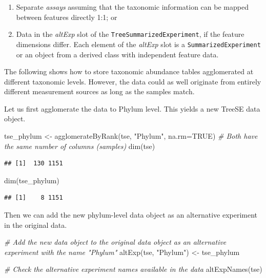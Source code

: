 \documentclass[
]{book}
\newenvironment{Shaded}{\begin{snugshade}}{\end{snugshade}}
\newcommand{\AttributeTok}[1]{\textcolor[rgb]{0.77,0.63,0.00}{#1}}
\newcommand{\CommentTok}[1]{\textcolor[rgb]{0.56,0.35,0.01}{\textit{#1}}}
\newcommand{\ConstantTok}[1]{\textcolor[rgb]{0.00,0.00,0.00}{#1}}
\newcommand{\FunctionTok}[1]{\textcolor[rgb]{0.00,0.00,0.00}{#1}}
\newcommand{\NormalTok}[1]{#1}
\newcommand{\OtherTok}[1]{\textcolor[rgb]{0.56,0.35,0.01}{#1}}
\newcommand{\StringTok}[1]{\textcolor[rgb]{0.31,0.60,0.02}{#1}}
\providecommand{\tightlist}{%
  \setlength{\itemsep}{0pt}\setlength{\parskip}{0pt}}
\begin{document}
\begin{enumerate}
\def\labelenumi{\arabic{enumi}.}
\tightlist
\item
  Separate \emph{assays} assuming that the taxonomic information can be mapped
  between features directly 1:1; or
\item
  Data in the \emph{altExp} slot of the \texttt{TreeSummarizedExperiment}, if the feature
  dimensions differ. Each element of the \emph{altExp} slot is a \texttt{SummarizedExperiment}
  or an object from a derived class with independent feature data.
\end{enumerate}

The following shows how to store taxonomic abundance tables
agglomerated at different taxonomic levels. However, the data could as
well originate from entirely different measurement sources as long as
the samples match.

Let us first agglomerate the data to Phylum level. This yields a new
TreeSE data object.

\begin{Shaded}
\begin{Highlighting}[]
\NormalTok{tse\_phylum }\OtherTok{\textless{}{-}} \FunctionTok{agglomerateByRank}\NormalTok{(tse, }\StringTok{"Phylum"}\NormalTok{, }\AttributeTok{na.rm=}\ConstantTok{TRUE}\NormalTok{)}
\CommentTok{\# Both have the same number of columns (samples)}
\FunctionTok{dim}\NormalTok{(tse)}
\end{Highlighting}
\end{Shaded}

\begin{verbatim}
## [1]  130 1151
\end{verbatim}

\begin{Shaded}
\begin{Highlighting}[]
\FunctionTok{dim}\NormalTok{(tse\_phylum)}
\end{Highlighting}
\end{Shaded}

\begin{verbatim}
## [1]    8 1151
\end{verbatim}

Then we can add the new phylum-level data object as an alternative experiment in the original data.

\begin{Shaded}
\begin{Highlighting}[]
\CommentTok{\# Add the new data object to the original data object as an alternative experiment with the name "Phylum"}
\FunctionTok{altExp}\NormalTok{(tse, }\StringTok{"Phylum"}\NormalTok{) }\OtherTok{\textless{}{-}}\NormalTok{ tse\_phylum}

\CommentTok{\# Check the alternative experiment names available in the data}
\FunctionTok{altExpNames}\NormalTok{(tse)}
\end{Highlighting}
\end{Shaded}
\end{document}
